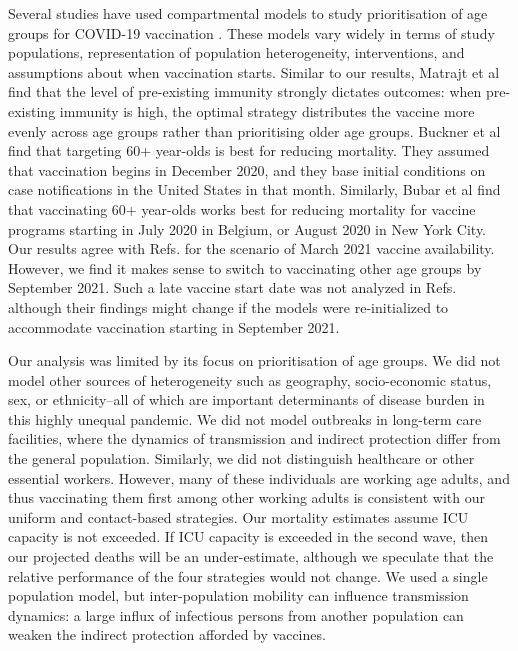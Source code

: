 Several studies have used compartmental models to study prioritisation of age groups for COVID-19 vaccination \cite{bubar2020model,hoyt2020vaccine,matrajt2020vaccine}. These models vary widely in terms of study populations, representation of population heterogeneity, interventions, and assumptions about when vaccination starts. Similar to our results, Matrajt et al \cite{matrajt2020vaccine}  find that the level of pre-existing immunity strongly dictates outcomes: when pre-existing immunity is high, the optimal strategy distributes the vaccine more evenly across age groups rather than prioritising older age groups. Buckner et al \cite{hoyt2020vaccine} find that targeting 60+ year-olds is best for reducing mortality. They assumed that vaccination begins in December 2020, and they base initial conditions on case notifications in the United States in that month. Similarly, Bubar et al \cite{bubar2020model} find that vaccinating 60+ year-olds works best for reducing mortality for vaccine programs starting in July 2020 in Belgium, or August 2020 in New York City. Our results agree with Refs. \cite{bubar2020model,hoyt2020vaccine} for the scenario of March 2021 vaccine availability. However, we find it makes sense to switch to vaccinating other age groups by September 2021. Such a late vaccine start date was not analyzed in Refs. \cite{bubar2020model,hoyt2020vaccine} although their findings might change if the models were re-initialized to accommodate vaccination starting in September 2021. 

Our analysis was limited by its focus on prioritisation of age groups.  We did not model other sources of heterogeneity such as geography, socio-economic status, sex, or ethnicity--all of which are important determinants of disease burden in this highly unequal pandemic. We did not model outbreaks in long-term care facilities, where the dynamics of transmission and indirect protection differ from the general population. Similarly, we did not distinguish healthcare or other essential workers. However, many of these individuals are working age adults, and thus vaccinating them first among other working adults is consistent with our uniform and contact-based strategies. Our mortality estimates assume ICU capacity is not exceeded. If ICU capacity is exceeded in the second wave, then our projected deaths will be an under-estimate, although we speculate that the relative performance of the four strategies would not change. We used a single population model, but inter-population mobility can influence transmission dynamics: a large influx of infectious persons from another population can weaken the indirect protection afforded by vaccines. 


